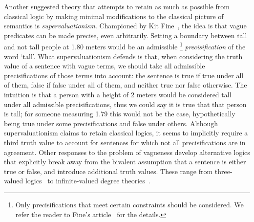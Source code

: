 \documentclass[a4paper]{article}
\begin{document}
Another suggested theory that attempts to retain as much as possible from classical logic by making minimal modifications to the classical picture of semantics is \emph{supervaluationism}.
Championed by Kit Fine~\parencite*{Fine1975}, the idea is that vague predicates can be made precise, even arbitrarily.
Setting a boundary between tall and not tall people at 1.80 meters would be an admissible%
\footnote{Only precisifications that meet certain constraints should be considered. We refer the reader to Fine's article~\parencite*{Fine1975} for the details.}
\emph{precisification} of the word `tall'.
What supervaluationism defends is that, when considering the truth value of a sentence with vague terms, we should take all admissible precisifications of those terms into account: the sentence is true if true under all of them, false if false under all of them, and neither true nor false otherwise.
The intuition is that a person with a height of 2 meters would be considered tall under all admissible precisifications, thus we could say it is true that that person is tall; for someone measuring 1.79 this would not be the case, hypothetically being true under some precisifications and false under others.
Although supervaluationism claims to retain classical logics, it seems to implicitly require a third truth value to account for sentences for which not all precisifications are in agreement.
Other responses to the problem of vagueness develop alternative logics that explicitly break away from the bivalent assumption that a sentence is either true or false, and introduce additional truth values.
These range from three-valued logics~\parencite[\emph{e.g.}][]{tye_sorites_1994} to infinite-valued degree theories~\parencite[\emph{e.g.}][]{machina_truth_1976}.
\end{document}

